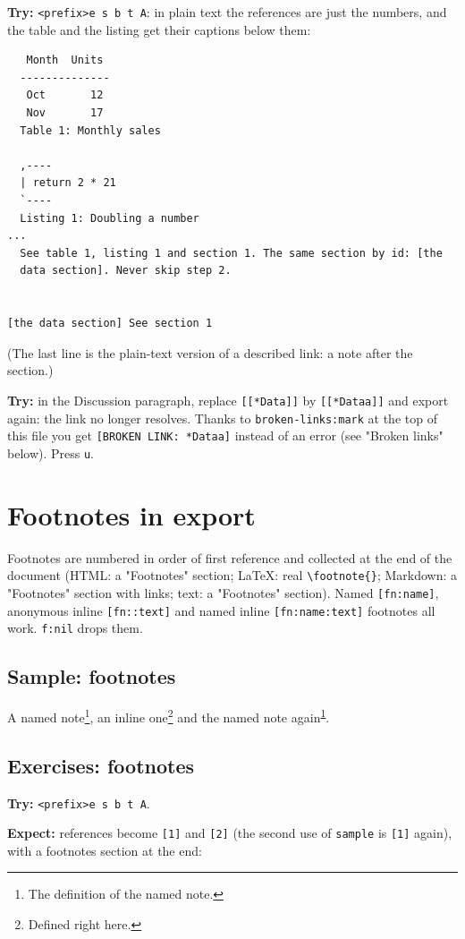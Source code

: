 \textbf{Try:} \texttt{<prefix>e s b t A}: in plain text the references are just the
numbers, and the table and the listing get their captions below them:

\begin{verbatim}
   Month  Units
  --------------
   Oct       12
   Nov       17
  Table 1: Monthly sales

  ,----
  | return 2 * 21
  `----
  Listing 1: Doubling a number
...
  See table 1, listing 1 and section 1. The same section by id: [the
  data section]. Never skip step 2.


[the data section] See section 1
\end{verbatim}

(The last line is the plain-text version of a described link: a note
after the section.)

\textbf{Try:} in the Discussion paragraph, replace \texttt{[[*Data]]} by \texttt{[[*Dataa]]} and
export again: the link no longer resolves. Thanks to \texttt{broken-links:mark} at
the top of this file you get \texttt{[BROKEN LINK: *Dataa]} instead of an error
(see "Broken links" below). Press \texttt{u}.
\section{Footnotes in export}
\label{sec:org5b7a29e}
Footnotes are numbered in order of first reference and collected at the
end of the document (HTML: a "Footnotes" section; \LaTeX{}: real
\texttt{\textbackslash{}footnote\{\}}; Markdown: a "Footnotes" section with links; text: a
"Footnotes" section). Named \texttt{[fn:name]}, anonymous inline \texttt{[fn::text]} and
named inline \texttt{[fn:name:text]} footnotes all work. \texttt{f:nil} drops them.
\subsection{Sample: footnotes}
\label{sec:org2580b9d}
A named note\footnote{The definition of the named note.\label{org42d1764}}, an inline one\footnote{Defined right here.} and the
named note again\textsuperscript{\ref{org42d1764}}.
\subsection{Exercises: footnotes}
\label{sec:org5f1eceb}
\textbf{Try:} \texttt{<prefix>e s b t A}.

\textbf{Expect:} references become \texttt{[1]} and \texttt{[2]} (the second use of \texttt{sample}
is \texttt{[1]} again), with a footnotes section at the end:

